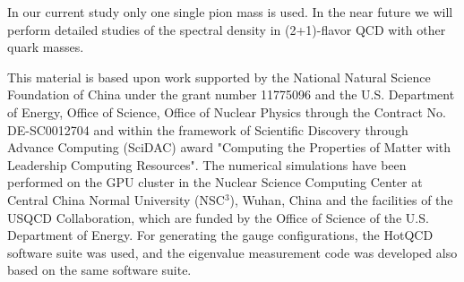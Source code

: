 \documentclass[a4paper,11pt]{article}
\numberwithin{equation}{section}
\begin{document}
In our current study only one single pion mass is used. In the near future we will perform detailed studies of the spectral
density in (2+1)-flavor QCD with other quark masses.




\acknowledgments
This material is based upon work supported by the National Natural Science Foundation of China under the grant number 11775096 and the U.S. Department of Energy, Office of Science, Office of Nuclear Physics through the Contract No. DE-SC0012704 and within the framework of Scientific Discovery through Advance Computing (SciDAC) award "Computing the Properties of Matter with Leadership Computing Resources".
The numerical simulations have been performed on the GPU cluster in the Nuclear Science Computing Center at Central China Normal University (NSC$^3$), Wuhan, China and the facilities of the USQCD Collaboration, which are funded by the Office of Science of the U.S. Department of Energy.
For generating the gauge configurations, the HotQCD software suite was used, and the eigenvalue measurement code was developed also based on the same software suite.


























\end{document}
